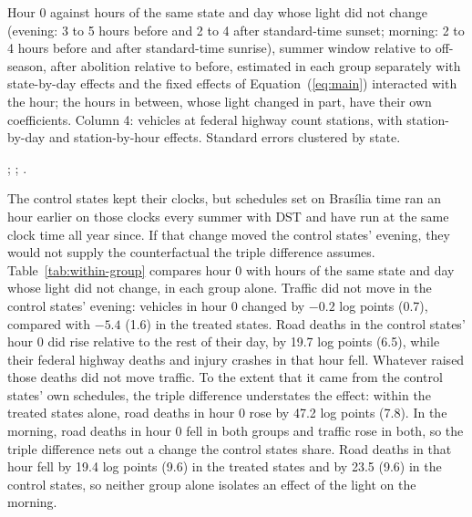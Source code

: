 \begin{table}[tbp]
  \caption{Within the Day, Treated and Control States Each Alone}
  \label{tab:within-group}
  \centering\footnotesize
  
  \begin{tablenotes}[Notes]
  Hour 0 against hours of the same state and day whose light did not change (evening: 3 to 5 hours before and 2 to 4 after standard-time sunset; morning: 2 to 4 hours before and after standard-time sunrise), summer window relative to off-season, after abolition relative to before, estimated in each group separately with state-by-day effects and the fixed effects of Equation~(\ref{eq:main}) interacted with the hour; the hours in between, whose light changed in part, have their own coefficients. Column 4: vehicles at federal highway count stations, with station-by-day and station-by-hour effects. Standard errors clustered by state.
  \end{tablenotes}
  \begin{tablenotes}[Sources]
  \citet{datasus2025sim}; \citet{prf2025dados}; \citet{dnit2025pnct}.
  \end{tablenotes}
\end{table}

The control states kept their clocks, but schedules set on Bras\'ilia time ran an hour earlier on those clocks every summer with DST and have run at the same clock time all year since. If that change moved the control states' evening, they would not supply the counterfactual the triple difference assumes. Table~\ref{tab:within-group} compares hour 0 with hours of the same state and day whose light did not change, in each group alone. Traffic did not move in the control states' evening: vehicles in hour 0 changed by $-0.2$ log points (0.7), compared with $-5.4$ (1.6) in the treated states. Road deaths in the control states' hour 0 did rise relative to the rest of their day, by 19.7 log points (6.5), while their federal highway deaths and injury crashes in that hour fell. Whatever raised those deaths did not move traffic. To the extent that it came from the control states' own schedules, the triple difference understates the effect: within the treated states alone, road deaths in hour 0 rose by 47.2 log points (7.8). In the morning, road deaths in hour 0 fell in both groups and traffic rose in both, so the triple difference nets out a change the control states share. Road deaths in that hour fell by 19.4 log points (9.6) in the treated states and by 23.5 (9.6) in the control states, so neither group alone isolates an effect of the light on the morning.

